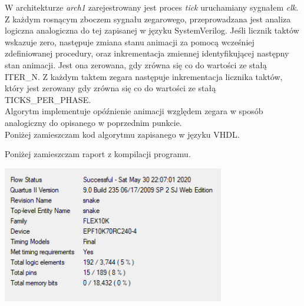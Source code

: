 \documentclass{article}
\begin{document}
        
        W architekturze \textit{arch1} zarejestrowany jest proces \textit{tick} uruchamiany sygnałem \textit{clk}. Z każdym rosnącym zboczem 
        sygnału zegarowego, przeprowadzana jest analiza logiczna analogiczna do tej zapisanej w języku SystemVerilog. Jeśli licznik taktów wskazuje zero, następuje zmiana stanu animacji za pomocą wcześniej zdefiniowanej procedury, oraz inkrementacja zmiennej identyfikującej następny stan animacji. Jest ona zerowana, gdy zrówna się co do wartości ze stałą ITER\_N. Z każdym taktem zegara następuje inkrementacja licznika taktów, który jest zerowany gdy zrówna się co do wartości ze stałą TICKS\_PER\_PHASE. \\
        
        Algorytm implementuje opóźnienie animacji względem zegara w sposób analogiczny do opisanego w poprzednim punkcie.\\ 
        
        Poniżej zamieszczam kod algorytmu zapisanego w języku VHDL. 
        
        
        Poniżej zamieszczam raport z kompilacji programu. 
        \begin{center}
            \includegraphics[height=6cm]{reports/img/fpga_comp_vhdl.png}\\
        \end{center}
    
\end{document}
